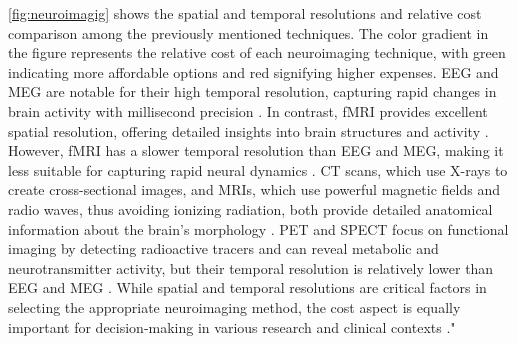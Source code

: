 \begin{table}[h]
\centering
\caption{Common neuroimaging techniques principle and working mechanism description}\label{table:neuroimaging}
\end{table}

\cref{fig:neuroimagig} shows the spatial and temporal resolutions and relative cost comparison among the previously mentioned techniques. The color gradient in the figure represents the relative cost of each neuroimaging technique, with green indicating more affordable options and red signifying higher expenses. EEG and MEG are notable for their high temporal resolution, capturing rapid changes in brain activity with millisecond precision \cite{shao2020eeg}. In contrast, fMRI provides excellent spatial resolution, offering detailed insights into brain structures and activity \cite{yuan2021bci}. However, fMRI has a slower temporal resolution than EEG and MEG, making it less suitable for capturing rapid neural dynamics \cite{li2021review}. CT scans, which use X-rays to create cross-sectional images, and MRIs, which use powerful magnetic fields and radio waves, thus avoiding ionizing radiation, both provide detailed anatomical information about the brain's morphology \cite{zhuang2020state}. PET and SPECT focus on functional imaging by detecting radioactive tracers and can reveal metabolic and neurotransmitter activity, but their temporal resolution is relatively lower than EEG and MEG \cite{ramadan2017brain}. While spatial and temporal resolutions are critical factors in selecting the appropriate neuroimaging method, the cost aspect is equally important for decision-making in various research and clinical contexts \cite{rashid2020current}."

